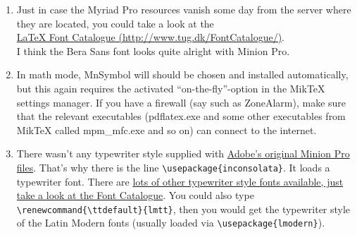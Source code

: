 \begin{enumerate}\setlength{\itemsep}{-2pt}
	\item Just in case the Myriad Pro resources vanish some day from the server where they are located, you could take a look at the\\
	\href{http://www.tug.dk/FontCatalogue/}{\LaTeX{} Font Catalogue (http://www.tug.dk/FontCatalogue/)}.\\
	I think the Bera Sans font looks quite alright with Minion Pro.
	\item In math mode, MnSymbol will should be chosen and installed automatically, but this again requires the activated ``on-the-fly''-option in the MikTeX settings manager. If you have a firewall (say such as ZoneAlarm), make sure that the relevant executables (pdflatex.exe and some other executables from MikTeX called mpm\_mfc.exe and so on) can connect to the internet.
	\item There wasn't any typewriter style supplied with \href{http://www.adobe.com/type/browser/P/P_1719.html}{Adobe's original Minion Pro files}. That's why there is the line \verb+\usepackage{inconsolata}+. It loads a typewriter font. There are \href{http://www.tug.dk/FontCatalogue/typewriterfonts.html}{lots of other typewriter style fonts available, just take a look at the Font Catalogue}. You could also type \verb+\renewcommand{\ttdefault}{lmtt}+, then you would get the typewriter style of the Latin Modern fonts (usually loaded via \verb+\usepackage{lmodern}+).
\end{enumerate}
%